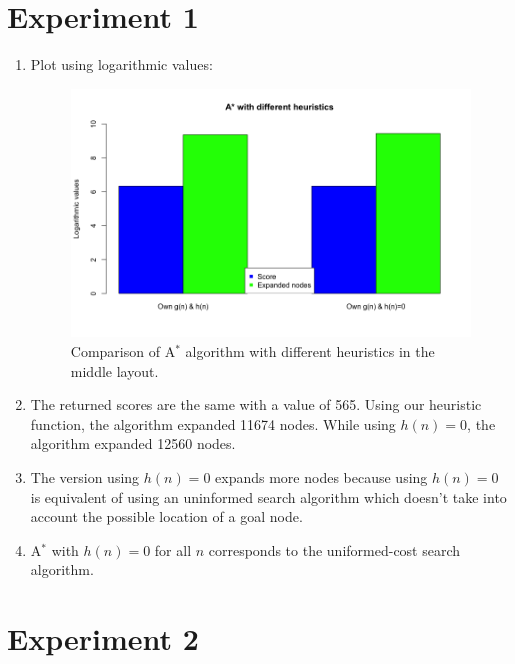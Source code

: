 \documentclass{article}
\begin{document}
\section{Experiment 1}

\begin{enumerate}[label=\alph*.,leftmargin=1.35em]
    \item Plot using logarithmic values:\\
    \begin{figure}[H]
        \centering
        \includegraphics[scale=0.5]{q3_plot.png} 
        \caption{Comparison of A$^*$ algorithm with different heuristics in the middle layout.}
    \end{figure}
    \item The returned scores are the same with a value of 565. Using our heuristic function, the algorithm expanded 11674 nodes. While using $h(n)=0$, the algorithm expanded 12560 nodes.
    \item The version using $h(n) = 0$ expands more nodes because using $h(n) = 0$ is equivalent of using an uninformed search algorithm which doesn't take into account the possible location of a goal node.
    \item A$^*$ with $h(n) = 0$ for all $n$ corresponds to the uniformed-cost search algorithm.
\end{enumerate}

\section{Experiment 2}
\end{document}
